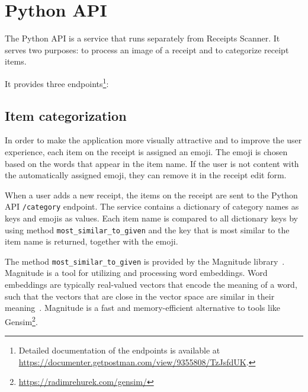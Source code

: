 \documentclass[
  digital, %
  table,   %
  oneside, %
  lof,     %
  lot,     %
]{fithesis3}
\DeclareRobustCommand{\thinskip}{\hskip 0.16667em\relax}
\def\emdash{---}
\def\dosh#1#2{\unskip#1\thinskip#2\thinskip\ignorespaces}
\def\Dash{\dosh\nobreak\emdash}
\begin{document}
\section{Python API}
\label{sec:python_api}
The Python API is a service that runs separately from Receipts Scanner. It serves two purposes: to process an image of a receipt and to categorize receipt items.

It provides three endpoints\footnote{Detailed documentation of the endpoints is available at \url{https://documenter.getpostman.com/view/9355808/TzJsfdUK}.}:


\subsection{Item categorization}
In order to make the application more visually attractive and to improve the user experience, each item on the receipt is assigned an emoji. The emoji is chosen based on the words that appear in the item name. If the user is not content with the automatically assigned emoji, they can remove it in the receipt edit form.

When a user adds a new receipt, the items on the receipt are sent to the Python API \texttt{/category} endpoint. The service contains a dictionary of category names as keys and emojis as values. Each item name is compared to all dictionary keys by using method \texttt{most\_similar\_to\_given} and the key that is most similar to the item name is returned, together with the emoji.

The method \texttt{most\_similar\_to\_given} is provided by the Magnitude library~\cite{PatelEtal2018Magnitude}. Magnitude is a tool for utilizing and processing word embeddings. Word embeddings are typically real-valued vectors that encode the meaning of a word, such that the vectors that are close in the vector space are similar in their meaning~\cite{Jurafsky2020Speech}. Magnitude is a fast and memory-efficient alternative to tools like Gensim\footnote{\url{https://radimrehurek.com/gensim/}}.
\end{document}

